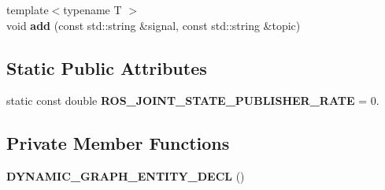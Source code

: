 \begin{DoxyCompactItemize}
\item 
\mbox{\label{classdynamic__graph_1_1RosPublish_af77a721d482487d5cf55929ccbbeef96}} 
{\footnotesize template$<$typename T $>$ }\\void {\bfseries add} (const std\+::string \&signal, const std\+::string \&topic)
\end{DoxyCompactItemize}
\subsection*{Static Public Attributes}
\begin{DoxyCompactItemize}
\item 
\mbox{\label{classdynamic__graph_1_1RosPublish_af3ffea00d60088a4b921a8a37b0f405d}} 
static const double {\bfseries R\+O\+S\+\_\+\+J\+O\+I\+N\+T\+\_\+\+S\+T\+A\+T\+E\+\_\+\+P\+U\+B\+L\+I\+S\+H\+E\+R\+\_\+\+R\+A\+TE} = 0.
\end{DoxyCompactItemize}
\subsection*{Private Member Functions}
\begin{DoxyCompactItemize}
\item 
\mbox{\label{classdynamic__graph_1_1RosPublish_a61cec4b9fc25dfde4be915937ff9aef0}} 
{\bfseries D\+Y\+N\+A\+M\+I\+C\+\_\+\+G\+R\+A\+P\+H\+\_\+\+E\+N\+T\+I\+T\+Y\+\_\+\+D\+E\+CL} ()
\end{DoxyCompactItemize}
